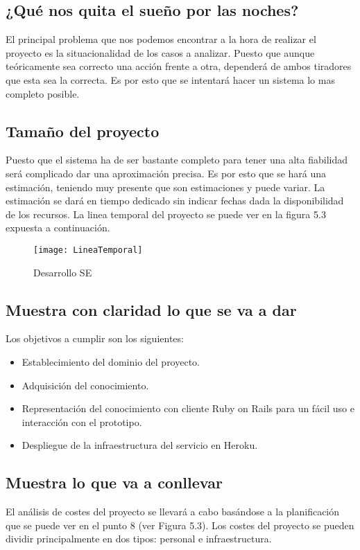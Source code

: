 \subsection{¿Qué nos quita el sueño por las noches?}
El principal problema que nos podemos encontrar a la hora de realizar el proyecto
es la situacionalidad de los casos a analizar. Puesto que aunque teóricamente
sea correcto una acción frente a otra, dependerá de ambos tiradores que esta
sea la correcta. Es por esto que se intentará hacer un sistema lo mas completo posible.

\subsection{Tamaño del proyecto}
Puesto que el sistema ha de ser bastante completo para tener una alta fiabilidad
será complicado dar una aproximación precisa. Es por esto que se hará una estimación,
teniendo muy presente que son estimaciones y puede variar. La estimación se dará en
tiempo dedicado sin indicar fechas dada la disponibilidad de los recursos. La linea
temporal del proyecto se puede ver en la figura 5.3 expuesta a continuación.

\begin{figure}[htb]
  \centering
    \texttt{[image: LineaTemporal]}
  \caption[Desarrollo SE]{Desarrollo SE}
  \label{fig:Desarrollo Sistema Experto}
\end{figure}

\subsection{Muestra con claridad lo que se va a dar}
Los objetivos a cumplir son los siguientes:

\begin{itemize}
  \item Establecimiento del dominio del proyecto.
  \item Adquisición del conocimiento.
  \item Representación del conocimiento con cliente Ruby on Rails para
    un fácil uso e interacción con el prototipo.
  \item Despliegue de la infraestructura del servicio en Heroku.
\end{itemize}

\subsection{Muestra lo que va a conllevar}
El análisis de costes del proyecto se llevará a cabo basándose a la planificación que se
puede ver en el punto 8 (ver Figura 5.3).
Los costes del proyecto se pueden dividir principalmente en dos tipos: personal e infraestructura.

